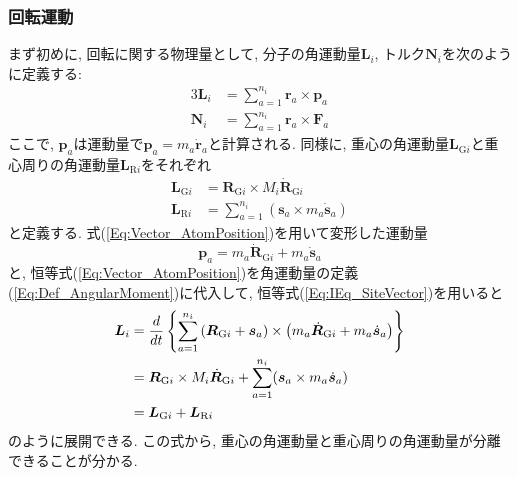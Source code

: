 \subsubsection{回転運動}
まず初めに, 回転に関する物理量として, 分子の角運動量$\bm{L}_{i}$, トルク$\bm{N}_{i}$を次のように定義する:
\begin{alignat}{3}
  \bm{L}_{i} &= \sum_{a=1}^{n_{i}} \bm{r}_{a} \times \bm{p}_{a}
  \label{Eq:Def_AngularMoment}
  \\
  \bm{N}_{i} &= \sum_{a=1}^{n_{i}} \bm{r}_{a} \times \bm{F}_{a}
  \label{Eq:Def_Torque}
\end{alignat}
ここで, $\bm{p}_{a}$は運動量で$\bm{p}_{a} = m_{a} \dot{\bm{r}}_{a}$と計算される.
同様に, 重心の角運動量$\bm{L}_{\mathrm{G}i}$と重心周りの角運動量$\bm{L}_{\mathrm{R}i}$をそれぞれ
\begin{align}
  \bm{L}_{\mathrm{G}i} &= \bm{R}_{\mathrm{G}i} \times M_{i} \dot{\bm{R}}_{\mathrm{G}i}
  \\
  \bm{L}_{\mathrm{R}i} &= \sum_{a=1}^{n_{i}} (\bm{s}_{a} \times m_{a} \dot{\bm{s}}_{a})
\end{align}
と定義する.
式(\ref{Eq:Vector_AtomPosition})を用いて変形した運動量
\begin{equation}
  \bm{p}_{a}
  =
  m_{a} \dot{\bm{R}}_{\mathrm{G}i} + m_{a}\dot{\bm{s}}_{a}
  \label{Eq:Momentum_Rg_s}
\end{equation}
と, 恒等式(\ref{Eq:Vector_AtomPosition})を角運動量の定義(\ref{Eq:Def_AngularMoment})に代入して, 恒等式(\ref{Eq:IEq_SiteVector})を用いると
\begin{align}
  \bm{L}_{i}
  &=
  \frac{d}{dt}
  \left\{
    \sum_{a=1}^{n_{i}}
    \left(\bm{R}_{\mathrm{G}i} + \bm{s}_{a}\right)
    \times
    \left(m_{a} \dot{\bm{R}}_{\mathrm{G}i} + m_{a}\dot{\bm{s}}_{a}\right)
  \right\}
  \notag \\
  &=
  \bm{R}_{\mathrm{G}i} \times M_{i} \dot{\bm{R}}_{\mathrm{G}i}
  +
  \sum_{a=1}^{n_{i}} (\bm{s}_{a} \times m_{a} \dot{\bm{s}}_{a})
  \notag \\
  &=
  \bm{L}_{\mathrm{G}i} + \bm{L}_{\mathrm{R}i}
\end{align}
のように展開できる.
この式から, 重心の角運動量と重心周りの角運動量が分離できることが分かる.

